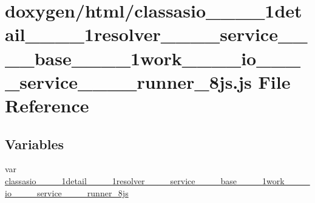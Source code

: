 \hypertarget{classasio____1____1detail____1____1resolver________service________base____1____1work________io__d7948e36165e341eb479589b6b7073e6}{}\section{doxygen/html/classasio\+\_\+\+\_\+\_\+\+\_\+1detail\+\_\+\+\_\+\_\+\+\_\+1resolver\+\_\+\+\_\+\+\_\+\+\_\+service\+\_\+\+\_\+\+\_\+\+\_\+base\+\_\+\+\_\+\_\+\+\_\+1work\+\_\+\+\_\+\+\_\+\+\_\+io\+\_\+\+\_\+\+\_\+\+\_\+service\+\_\+\+\_\+\+\_\+\+\_\+runner\+\_\+8js.js File Reference}
\label{classasio____1____1detail____1____1resolver________service________base____1____1work________io__d7948e36165e341eb479589b6b7073e6}
\subsection*{Variables}
\begin{DoxyCompactItemize}
\item 
var \hyperlink{classasio____1____1detail____1____1resolver________service________base____1____1work________io__d7948e36165e341eb479589b6b7073e6_ad568dfbecba0b0428a1bb0fd303785ef}{classasio\+\_\+\+\_\+\_\+\+\_\+1detail\+\_\+\+\_\+\_\+\+\_\+1resolver\+\_\+\+\_\+\+\_\+\+\_\+service\+\_\+\+\_\+\+\_\+\+\_\+base\+\_\+\+\_\+\_\+\+\_\+1work\+\_\+\+\_\+\+\_\+\+\_\+io\+\_\+\+\_\+\+\_\+\+\_\+service\+\_\+\+\_\+\+\_\+\+\_\+runner\+\_\+8js}
\end{DoxyCompactItemize}


